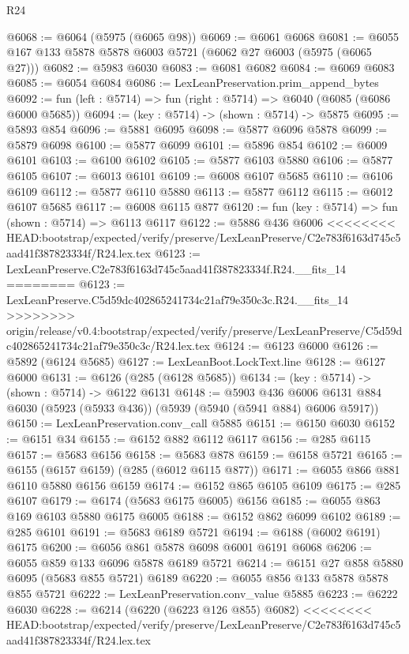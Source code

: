 \begin{lexlean}{R24}
\begin{coremodule}
{{{{{{{{{{{{{{{{{{{{{{{{{{{{{{{{{{{{{{{{{{{{{{{{{{{{{{{{{{{{{{{{{{{{{{{{{{{{{{{{{{{{{{{{{{{{{{{{{{{{{{{{{{{{{{{{{{{{{{{{{{{{{{{{{{{{{{{{{{{{{{{{{{{{{{{{{{{{{{{{{{{{{{{{{{{{{{{{{{{{{{{{{{{{{{{{{{{@6068 := @6064 (@5975 (@6065 @98))
@6069 := @6061 @6068
@6081 := @6055 @167 @133 @5878 @5878 @6003 @5721 (@6062 @27 @6003 (@5975 (@6065 @27)))
@6082 := @5983 @6030
@6083 := @6081 @6082
@6084 := @6069 @6083
@6085 := @6054 @6084
@6086 := LexLeanPreservation.prim_append_bytes
@6092 := fun (left : @5714) => fun (right : @5714) => @6040 (@6085 (@6086 @6000 @5685))
@6094 := (key : @5714) -> (shown : @5714) -> @5875
@6095 := @5893 @854
@6096 := @5881 @6095
@6098 := @5877 @6096 @5878
@6099 := @5879 @6098
@6100 := @5877 @6099
@6101 := @5896 @854
@6102 := @6009 @6101
@6103 := @6100 @6102
@6105 := @5877 @6103 @5880
@6106 := @5877 @6105
@6107 := @6013 @6101
@6109 := @6008 @6107 @5685
@6110 := @6106 @6109
@6112 := @5877 @6110 @5880
@6113 := @5877 @6112
@6115 := @6012 @6107 @5685
@6117 := @6008 @6115 @877
@6120 := fun (key : @5714) => fun (shown : @5714) => @6113 @6117
@6122 := @5886 @436 @6006
<<<<<<<< HEAD:bootstrap/expected/verify/preserve/LexLeanPreserve/C2e783f6163d745c5aad41f387823334f/R24.lex.tex
@6123 := LexLeanPreserve.C2e783f6163d745c5aad41f387823334f.R24.__fits_14
========
@6123 := LexLeanPreserve.C5d59dc402865241734c21af79e350c3c.R24.__fits_14
>>>>>>>> origin/release/v0.4:bootstrap/expected/verify/preserve/LexLeanPreserve/C5d59dc402865241734c21af79e350c3c/R24.lex.tex
@6124 := @6123 @6000
@6126 := @5892 (@6124 @5685)
@6127 := LexLeanBoot.LockText.line
@6128 := @6127 @6000
@6131 := @6126 (@285 (@6128 @5685))
@6134 := (key : @5714) -> (shown : @5714) -> @6122 @6131
@6148 := @5903
    @436
    @6006
    @6131
    @884
    @6030
    (@5923 (@5933 @436))
    (@5939 (@5940 (@5941 @884) @6006 @5917))
@6150 := LexLeanPreservation.conv_call @5885
@6151 := @6150 @6030
@6152 := @6151 @34
@6155 := @6152 @882 @6112 @6117
@6156 := @285 @6115
@6157 := @5683 @6156
@6158 := @5683 @878
@6159 := @6158 @5721
@6165 := @6155 (@6157 @6159) (@285 (@6012 @6115 @877))
@6171 := @6055 @866 @881 @6110 @5880 @6156 @6159
@6174 := @6152 @865 @6105 @6109
@6175 := @285 @6107
@6179 := @6174 (@5683 @6175 @6005) @6156
@6185 := @6055 @863 @169 @6103 @5880 @6175 @6005
@6188 := @6152 @862 @6099 @6102
@6189 := @285 @6101
@6191 := @5683 @6189 @5721
@6194 := @6188 (@6002 @6191) @6175
@6200 := @6056 @861 @5878 @6098 @6001 @6191 @6068
@6206 := @6055 @859 @133 @6096 @5878 @6189 @5721
@6214 := @6151 @27 @858 @5880 @6095 (@5683 @855 @5721) @6189
@6220 := @6055 @856 @133 @5878 @5878 @855 @5721
@6222 := LexLeanPreservation.conv_value @5885
@6223 := @6222 @6030
@6228 := @6214 (@6220 (@6223 @126 @855) @6082)
<<<<<<<< HEAD:bootstrap/expected/verify/preserve/LexLeanPreserve/C2e783f6163d745c5aad41f387823334f/R24.lex.tex
}}}}}}}}}}}}}}}}}}}}}}}}}}}}}}}}}}}}}}}}}}}}}}}}}}}}}}}}}}}}}}}}}}}}}}}}}}}}}}}}}}}}}}}}}}}}}}}}}}}}}}}}}}}}}}}}}}}}}}}}}}}}}}}}}}}}}}}}}}}}}}}}}}}}}}}}}}}}}}}}}}}}}}}}}}}}}}}}}}}}}}}}}}}}}}}}}}}
\end{coremodule}
\end{lexlean}

